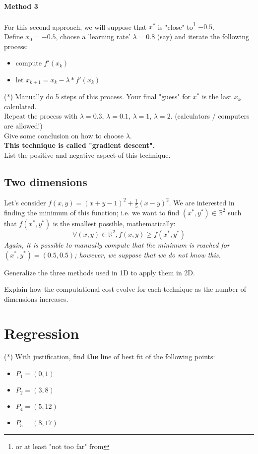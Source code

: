 \documentclass[]{article}
\newcommand{\R}{\mathbb{R}}
\begin{document}
	\paragraph{Method 3}
	For this second approach, we will suppose that $x^*$ is "close" to\footnote{or at least "not too far" from} $-0.5$.\\
	Define $x_0=-0.5$, choose a 'learning rate' $\lambda=0.8$ (say) and iterate the following process:
	\begin{itemize}
		\item compute $f'(x_k)$
		\item let $x_{k+1} = x_k - \lambda * f'(x_k)$
	\end{itemize}
	(*) Manually do 5 steps of this process.
	Your final "guess" for $x^*$ is the last $x_k$ calculated.\\
	Repeat the process with $\lambda=0.3$, $\lambda=0.1$, $\lambda=1$, $\lambda=2$. (calculators / computers are allowed!)\\
	Give some conclusion on how to choose $\lambda$.\\
	\textbf{This technique is called "gradient descent".}\\
	List the positive and negative aspect of this technique.
	
	\subsection{Two dimensions}
	Let's consider $f(x,y) = (x+y-1)^2 + \frac{1}{5}(x-y)^2$.
	We are interested in finding the minimum of this function; 
	i.e. we want to find $(x^*,y^*) \in \R^2$ such that $f(x^*,y^*)$ is the smallest possible, mathematically:
	$$\forall (x,y) \in \R^2, f(x,y) \geq f(x^*, y^*)$$
	\textit{Again, it is possible to manually compute that the minimum is reached for $(x^*, y^*) = (0.5, 0.5)$; however, we suppose that we do not know this.}
	
	Generalize the three methods used in 1D to apply them in 2D.
		
	Explain how the computational cost evolve for each technique as the number of dimensions increases.
	
	\section{Regression}
	(*) With justification, find \textbf{the} line of best fit of the following points:
	\begin{itemize}
		\item $P_1 = (0,1)$
		\item $P_2 = (3,8)$
		\item $P_4 = (5,12)$
		\item $P_5 = (8,17)$
	\end{itemize}
	
	
\end{document}
